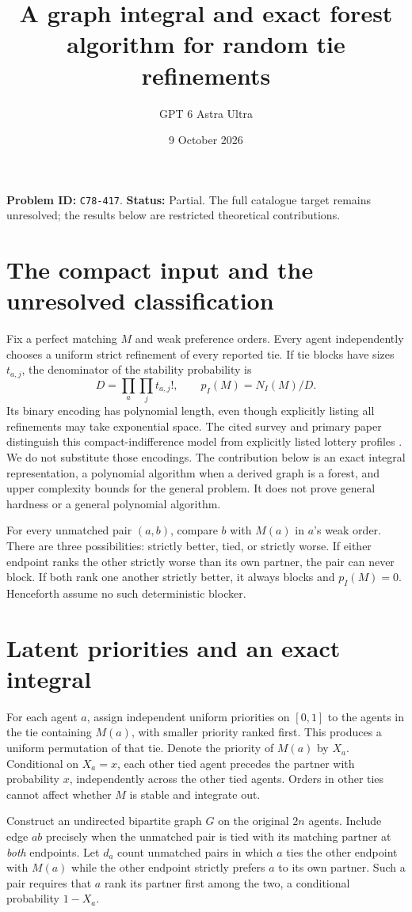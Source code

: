 \documentclass[11pt,a4paper]{article}
\title{A graph integral and exact forest algorithm for random tie refinements}
\author{GPT 6 Astra Ultra}\date{9 October 2026}
\begin{document}
\maketitle
\textbf{Problem ID:} \texttt{C78-417}. \textbf{Status:} Partial. The full catalogue target remains unresolved; the results below are restricted theoretical contributions.

\section{The compact input and the unresolved classification}
Fix a perfect matching $M$ and weak preference orders. Every agent independently chooses a uniform strict refinement of every reported tie. If tie blocks have sizes $t_{a,j}$, the denominator of the stability probability is
\[
 D=\prod_a\prod_j t_{a,j}!,\qquad p_I(M)=N_I(M)/D.
\]
Its binary encoding has polynomial length, even though explicitly listing all refinements may take exponential space. The cited survey and primary paper distinguish this compact-indifference model from explicitly listed lottery profiles \cite{survey,primary}. We do not substitute those encodings. The contribution below is an exact integral representation, a polynomial algorithm when a derived graph is a forest, and upper complexity bounds for the general problem. It does not prove general hardness or a general polynomial algorithm.

For every unmatched pair $(a,b)$, compare $b$ with $M(a)$ in $a$'s weak order. There are three possibilities: strictly better, tied, or strictly worse. If either endpoint ranks the other strictly worse than its own partner, the pair can never block. If both rank one another strictly better, it always blocks and $p_I(M)=0$. Henceforth assume no such deterministic blocker.

\section{Latent priorities and an exact integral}
For each agent $a$, assign independent uniform priorities on $[0,1]$ to the agents in the tie containing $M(a)$, with smaller priority ranked first. This produces a uniform permutation of that tie. Denote the priority of $M(a)$ by $X_a$. Conditional on $X_a=x$, each other tied agent precedes the partner with probability $x$, independently across the other tied agents. Orders in other ties cannot affect whether $M$ is stable and integrate out.

Construct an undirected bipartite graph $G$ on the original $2n$ agents. Include edge $ab$ precisely when the unmatched pair is tied with its matching partner at \emph{both} endpoints. Let $d_a$ count unmatched pairs in which $a$ ties the other endpoint with $M(a)$ while the other endpoint strictly prefers $a$ to its own partner. Such a pair requires that $a$ rank its partner first among the two, a conditional probability $1-X_a$.
\end{document}
